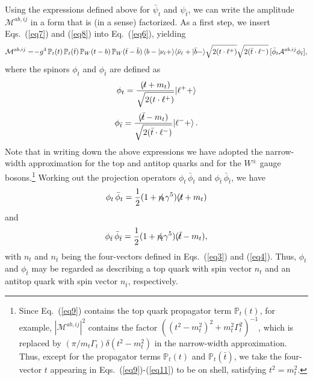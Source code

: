 \documentclass[aps,preprint,tightenlines,floatfix,superscriptaddress,nofootinbib,showpacs]{revtex4-1}
\def\beq{\begin{equation}}
\def\eeq{\end{equation}}
\def\tbslash{\tbar\hspace{-10pt}\not{}\hspace{4pt}}
\def\tslash{t\hspace{-10pt}\not{}\hspace{4pt}}
\def\nslash{n\hspace{-10pt}\not{}\hspace{4pt}}
\def\tbar{\bar{t}}
\def\bbar{\bar{b}}
\def\nubar{{\bar{\nu}}_{\ell}}
\begin{document}
Using the expressions defined above for $\bar{\psi}_t$ and
$\psi_{\tbar}$, we can write the amplitude $\mathcal{M}^{ab,ij}$
in a form that is (in a sense) factorized.
As a first step, we insert
Eqs.~(\ref{eq7}) and (\ref{eq8}) into Eq.~(\ref{eq6}), yielding
%
\beq
\label{eq9}
\mathcal{M}^{ab,ij}=\!-g^4\,\mathbb{P}_t(t)\,\mathbb{P}_t(\tbar)\,\mathbb{P}_W(t-b)\,\mathbb{P}_W(\tbar-\bbar)\,\langle b-|\nu_{\ell}+\rangle \langle\nubar+|\bbar-\rangle \sqrt{\strut2(t\cdot {\ell}^+)}\sqrt{\strut2(\tbar\cdot {\ell}^-)}\,[\bar{\phi}_t \mathcal{A}^{ab,ij}\phi_{\tbar}],
\eeq
%
where the spinors $\phi_{t}$ and $\phi_{\tbar}$ are defined as
%
\beq
\label{eq10}
\phi_t=\frac{(\tslash +m_t)}{\sqrt{\strut2(t\cdot {\ell}^+)}}|{\ell}^++\rangle
\eeq
%
\beq
\label{eq11}
\phi_{\tbar}=\frac{(\tbslash -m_t)}{\sqrt{\strut2(\tbar\cdot {\ell}^-)}}|{\ell}^-+\rangle \,.
\eeq
%
Note that in writing down the above expressions we have adopted the narrow-width
approximation for the top and antitop quarks and for the $W^\pm$ gauge
bosons.\footnote{Since Eq.~(\ref{eq9}) contains the top quark propagator
  term
  $\mathbb{P}_t(t)$, for example, $|\mathcal{M}^{ab,ij}|^2$ contains
  the factor $((t^2-m^2_t)^2+m^2_t\Gamma^2_t)^{-1}$,
  which is replaced by $(\pi/m_t\Gamma_t)\delta(t^2-m^2_t)$
  in the narrow-width approximation.  Thus, except for the propagator terms $\mathbb{P}_t(t)$ and $\mathbb{P}_t(\tbar)$,
   we take the four-vector $t$ appearing in Eqs.~(\ref{eq9})-(\ref{eq11}) to be
  on shell, satisfying $t^2 = m_t^2$.} 
Working out the projection operators $\phi_t\,\bar{\phi}_t$
and $\phi_{\tbar}\,\bar{\phi}_{\tbar}$, we have
%
\beq
\label{eq12}
\phi_t\,\bar{\phi}_t=\frac{1}{2}(1+\nslash_{\!t}\gamma^5)(\tslash +m_t)
\eeq
%
and
%
\beq
\label{eq13}
\phi_{\tbar}\,\bar{\phi}_{\tbar}=\frac{1}{2}(1+\nslash_{\!\tbar}\gamma^5)(\tbslash -m_t),
\eeq
%
with $n_t$ and $n_{\tbar}$ being the four-vectors defined in
Eqs.~(\ref{eq3}) and (\ref{eq4}).  Thus, $\phi_t$ and $\phi_{\tbar}$
may be regarded as
describing a top quark with spin vector $n_t$ and an antitop quark
with spin vector $n_{\tbar}$, respectively.
\end{document}
